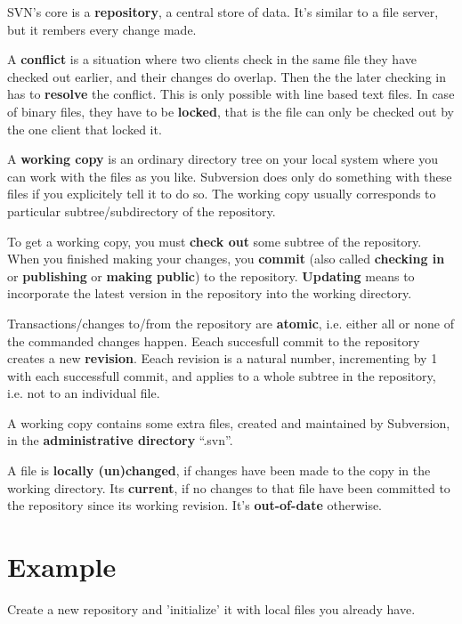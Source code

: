 \documentclass[a4paper]{report}
\begin{document}
SVN's core is a \textbf{repository}, a central store of data.  It's similar
to a file server, but it rembers every change made.  

A \textbf{conflict} is a situation where two clients check in the same file
they have checked out earlier, and their changes do overlap.  Then the
the later checking in has to \textbf{resolve} the conflict.  This is only
possible with line based text files.  In case of binary files, they have
to be \textbf{locked}, that is the file can only be checked out by the one
client that locked it.  

A \textbf{working copy} is an ordinary directory tree on your local system
where you can work with the files as you like.  Subversion does only do
something with these files if you explicitely tell it to do so.  The
working copy usually corresponds to particular subtree/subdirectory of
the repository.  

To get a working copy, you must \textbf{check out} some subtree of the
repository. When you finished making your changes, you \textbf{commit} (also
called \textbf{checking in} or \textbf{publishing} or \textbf{making public}) to the
repository.  \textbf{Updating} means to incorporate the latest version in
the repository into the working directory.

Transactions/changes to/from the repository are \textbf{atomic}, i.e. either
all or none of the commanded changes happen. Eeach succesfull commit to
the repository creates a new \textbf{revision}. Eeach revision is a natural
number, incrementing by 1 with each successfull commit, and applies to a
whole subtree in the repository, i.e. not to an individual file.

A working copy contains some extra files, created and maintained by
Subversion, in the \textbf{administrative directory} ``.svn''. 

A file is \textbf{locally (un)changed}, if changes have been made to the
copy in the working directory. Its \textbf{current}, if no changes to
that file have been committed to the repository since its working
revision. It's \textbf{out-of-date} otherwise.

\chapter{Example}

Create a new repository and 'initialize' it with local files you already have.
\end{document}

